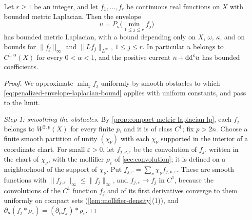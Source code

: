 \begin{theorem}\label{thm:kahler-metric-laplacian-rooftop}
Let $r\geq1$ be an integer, and let $f_1,\ldots,f_r$ be continuous real functions on $X$ with bounded metric Laplacian. Then the envelope
\[
 u=P_\kappa\bigl(\min_{1\leq j\leq r}f_j\bigr)
\]
has bounded metric Laplacian, with a bound depending only on $X$, $\omega$, $\kappa$, and on bounds for $\|f_j\|_\infty$ and $\|Lf_j\|_{L^\infty}$, $1\leq j\leq r$. In particular $u$ belongs to $C^{1,\alpha}(X)$ for every $0<\alpha<1$, and the positive current $\kappa+\mathrm{dd}^{\mathrm{c}} u$ has bounded coefficients.
\end{theorem}
\begin{proof}
We approximate $\min_jf_j$ uniformly by smooth obstacles to which \eqref{eq:penalized-envelope-laplacian-bound} applies with uniform constants, and pass to the limit.

\emph{Step 1: smoothing the obstacles.} By \cref{prop:compact-metric-laplacian-lp}, each $f_j$ belongs to $W^{2,p}(X)$ for every finite $p$, and it is of class $C^1$; fix $p>2n$. Choose a finite smooth partition of unity $(\chi_\nu)$ with each $\chi_\nu$ supported in the interior of a coordinate chart. For small $\varepsilon>0$, let $f_{j,\nu,\varepsilon}$ be the convolution of $f_j$, written in the chart of $\chi_\nu$, with the mollifier $\rho_\varepsilon$ of \cref{sec:convolution}; it is defined on a neighborhood of the support of $\chi_\nu$. Put $f_{j,\varepsilon}=\sum_\nu\chi_\nu f_{j,\nu,\varepsilon}$. These are smooth functions with $\|f_{j,\varepsilon}\|_\infty\leq\|f_j\|_\infty$, and $f_{j,\varepsilon}\to f_j$ in $C^1$, because the convolutions of the $C^1$ function $f_j$ and of its first derivatives converge to them uniformly on compact sets (\cref{lem:mollifier-density}(1)), and $\partial_\mu(f_j*\rho_\varepsilon)=(\partial_\mu f_j)*\rho_\varepsilon$.


\end{proof}
